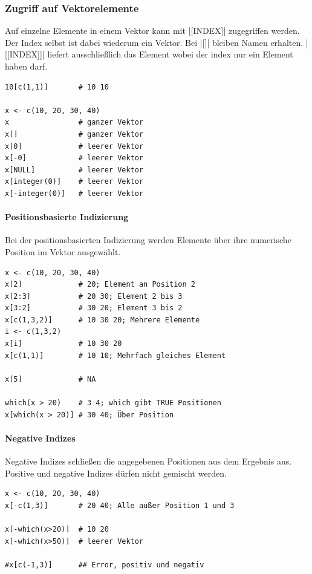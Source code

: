 \documentclass[10pt,twocolumn]{scrartcl}
\renewcommand{\lstinline}{\mycoloredinline}
\begin{document}
\subsubsection{Zugriff auf Vektorelemente}

Auf einzelne Elemente in einem Vektor kann mit \lstinline|[INDEX]| zugegriffen werden. Der Index selbst ist dabei wiederum ein Vektor. Bei \lstinline|[]| bleiben Namen erhalten. \lstinline|[[INDEX]]| liefert ausschließlich das Element wobei der index nur ein Element haben darf.

\begin{lstlisting}
10[c(1,1)]       # 10 10

x <- c(10, 20, 30, 40)
x                # ganzer Vektor
x[]              # ganzer Vektor
x[0]             # leerer Vektor
x[-0]            # leerer Vektor
x[NULL]          # leerer Vektor
x[integer(0)]    # leerer Vektor
x[-integer(0)]   # leerer Vektor
\end{lstlisting}


\paragraph{Positionsbasierte Indizierung}

Bei der positionsbasierten Indizierung werden Elemente über ihre numerische Position im Vektor ausgewählt.

\begin{lstlisting}
x <- c(10, 20, 30, 40)
x[2]             # 20; Element an Position 2
x[2:3]           # 20 30; Element 2 bis 3
x[3:2]           # 30 20; Element 3 bis 2
x[c(1,3,2)]      # 10 30 20; Mehrere Elemente
i <- c(1,3,2)
x[i]             # 10 30 20
x[c(1,1)]        # 10 10; Mehrfach gleiches Element

x[5]             # NA

which(x > 20)    # 3 4; which gibt TRUE Positionen
x[which(x > 20)] # 30 40; Über Position
\end{lstlisting}


\paragraph{Negative Indizes}

Negative Indizes schließen die angegebenen Positionen aus dem Ergebnis aus. Positive und negative Indizes dürfen nicht gemischt werden.

\begin{lstlisting}
x <- c(10, 20, 30, 40)
x[-c(1,3)]       # 20 40; Alle außer Position 1 und 3

x[-which(x>20)]  # 10 20
x[-which(x>50)]  # leerer Vektor

#x[c(-1,3)]      ## Error, positiv und negativ
\end{lstlisting}
\end{document}
